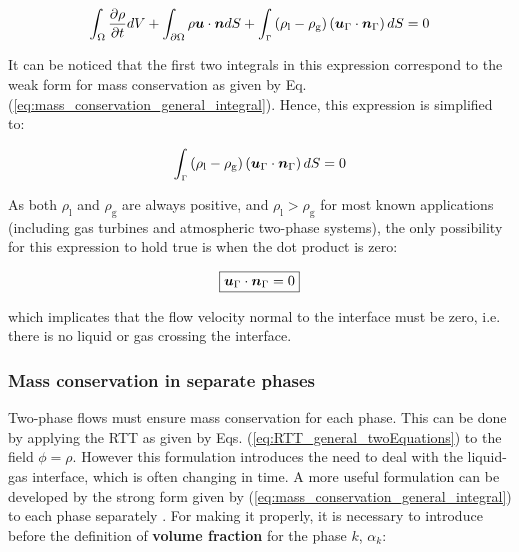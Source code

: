 \begin{equation}
\int_{\Omega}  \frac{\partial \rho}{\partial t}  dV + \int_{\partial \Omega} \rho \boldsymbol{u} \cdot \boldsymbol{n} dS + \int_\mathsmaller{\Gamma} \left( \rho_\mathrm{l} - \rho_\mathrm{g} \right) \left( \boldsymbol{u}_{\scriptsize{\Gamma}} \cdot \boldsymbol{n}_{\scriptsize{\Gamma}}\right) dS = 0
\end{equation}

It can be noticed that the first two integrals in this expression correspond to the weak form for mass conservation as given by Eq. (\ref{eq:mass_conservation_general_integral}). Hence, this expression is simplified to:

\begin{equation}
\int_\mathsmaller{\Gamma} \left( \rho_\mathrm{l} - \rho_\mathrm{g} \right) \left( \boldsymbol{u}_{\scriptsize{\Gamma}} \cdot \boldsymbol{n}_{\scriptsize{\Gamma}} \right) dS = 0
\end{equation}

As both $\rho_\mathrm{l}$ and $\rho_\mathrm{g}$ are always positive, and $\rho_\mathrm{l} > \rho_\mathrm{g}$ for most known applications (including gas turbines and atmospheric two-phase systems), the only possibility for this expression to hold true is when the dot product is zero:

\begin{equation}
\label{eq:continuity_TPF_noFluxThroughInterface}
\boxed{
\boldsymbol{u}_{\scriptsize{\Gamma}} \cdot \boldsymbol{n}_{\scriptsize{\Gamma}} = 0
}
\end{equation}

which implicates that the flow velocity normal to the interface must be zero, i.e. there is no liquid or gas crossing the interface. 

\subsubsection*{Mass conservation in separate phases}
	\label{eq:mass_conservation_separated_phases}

Two-phase flows must ensure mass conservation for each phase. This can be done by applying the RTT as given by Eqs. (\ref{eq:RTT_general_twoEquations}) to the field $\phi = \rho$. However this formulation introduces the need to deal with the liquid-gas interface, which is often changing in time. A more useful formulation can be developed by the strong form given by (\ref{eq:mass_conservation_general_integral}) to each phase separately . For making it properly, it is necessary to introduce before the definition of \textbf{volume fraction} for the phase $k$, $\alpha_k$:

